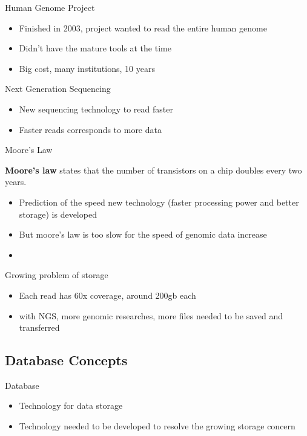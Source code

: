 \documentclass{beamer}
\begin{document}
\begin{frame}{Human Genome Project}
  \begin{itemize}   
    \item Finished in 2003, project wanted to read the entire human genome
    \item Didn't have the mature tools at the time
    \item Big cost, many institutions, 10 years \cite{introgenomics}
  \end{itemize}
\end{frame}

\begin{frame}{Next Generation Sequencing}
  \begin{itemize}   
    \item New sequencing technology to read faster
    \item Faster reads corresponds to more data
  \end{itemize}
\end{frame}

\begin{frame}{Moore's Law}
  \begin{block}{\textbf{Moore's law}} 
    states that the number of transistors on a chip doubles every two years.\cite{kurose}
  \end{block}
  \begin{itemize}   
    \item Prediction of the speed new technology (faster processing power and better storage) is developed
    \item But moore's law is too slow for the speed of genomic data increase
    \item
  \end{itemize}
\end{frame}

\begin{frame}{Growing problem of storage}
  \begin{itemize}   
    \item Each read\cite{seqtorr} has 60x coverage, around 200gb each
    \item with NGS, more genomic researches, more files needed to be saved and transferred
  \end{itemize}
\end{frame}

\subsection{Database Concepts}
\begin{frame}{Database}
  \begin{itemize}   
    \item Technology for data storage
    \item Technology needed to be developed to resolve the growing storage concern
  \end{itemize}
\end{frame}
\end{document}
